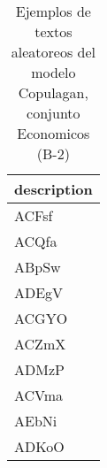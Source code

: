 \begin{table}[H]
\centering
\fontsize{8}{14}\selectfont
\caption{Ejemplos de textos aleatoreos del modelo Copulagan, conjunto Economicos (B-2)}
\label{table-sample10-economicos-b-2-copulagan-text}
\begin{tabular}{|m{50em}|}
\hline
\rowcolor[gray]{0.8}
description \\
\hline ACFsf \\
\hline ACQfa \\
\hline ABpSw \\
\hline ADEgV \\
\hline ACGYO \\
\hline ACZmX \\
\hline ADMzP \\
\hline ACVma \\
\hline AEbNi \\
\hline ADKoO \\
\hline
\end{tabular}
\end{table}
